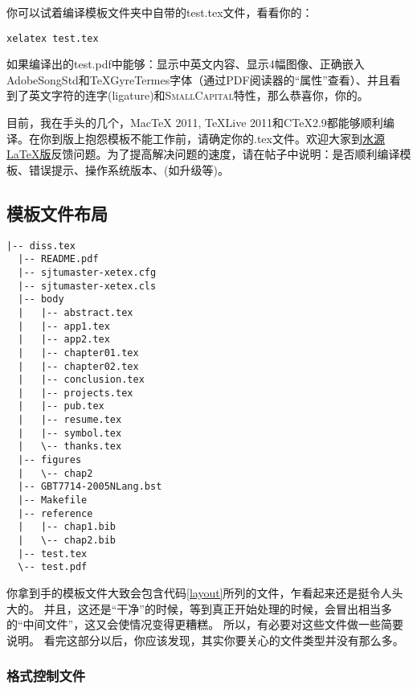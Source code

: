 你可以试着编译模板文件夹中自带的test.tex文件，看看你的：

\begin{lstlisting}[basicstyle=\small\ttfamily, caption={编译测试文件test.tex}, numbers=none]
xelatex test.tex
\end{lstlisting}

如果编译出的test.pdf中能够：显示中英文内容、显示4幅图像、正确嵌入AdobeSongStd和TeXGyreTermes字体（通过PDF阅读器的“属性”查看）、并且看到了英文字符的连字(ligature)和\textsc{SmallCapital}特性，那么恭喜你，你的。

目前，我在手头的几个，MacTeX 2011, TeXLive 2011和C\TeX 2.9都能够顺利编译。在你到版上抱怨模板不能工作前，请确定你的.tex文件。欢迎大家到\href{https://bbs.sjtu.edu.cn/bbsdoc?board=TeX_LaTeX}{水源LaTeX版}反馈问题。为了提高解决问题的速度，请在帖子中说明：是否顺利编译模板、错误提示、操作系统版本、(如升级等)。
 
\subsection{模板文件布局}
\label{sec:layout}

\begin{lstlisting}[basicstyle=\small\ttfamily,caption={模板文件布局},label=layout,float,numbers=none]
  |-- diss.tex
  |-- README.pdf
  |-- sjtumaster-xetex.cfg
  |-- sjtumaster-xetex.cls
  |-- body
  |   |-- abstract.tex
  |   |-- app1.tex
  |   |-- app2.tex
  |   |-- chapter01.tex
  |   |-- chapter02.tex
  |   |-- conclusion.tex
  |   |-- projects.tex
  |   |-- pub.tex
  |   |-- resume.tex
  |   |-- symbol.tex
  |   \-- thanks.tex
  |-- figures
  |   \-- chap2
  |-- GBT7714-2005NLang.bst
  |-- Makefile
  |-- reference
  |   |-- chap1.bib
  |   \-- chap2.bib
  |-- test.tex
  \-- test.pdf
\end{lstlisting}

你拿到手的模板文件大致会包含代码\ref{layout}所列的文件，乍看起来还是挺令人头大的。
并且，这还是“干净”的时候，等到真正开始处理的时候，会冒出相当多的“中间文件”，这又会使情况变得更糟糕。
所以，有必要对这些文件做一些简要说明。
看完这部分以后，你应该发现，其实你要关心的文件类型并没有那么多。

\subsubsection{格式控制文件}
\label{sec:format}

